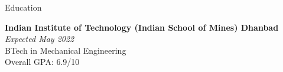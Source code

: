 \documentclass{resume} %
\begin{document}

\begin{rSection}{Education}

{\bf Indian Institute of Technology (Indian School of Mines) Dhanbad} \hfill {\em Expected May 2022} \\ 
BTech in Mechanical Engineering \\
Overall GPA: 6.9/10

\end{rSection}

\end{document}
